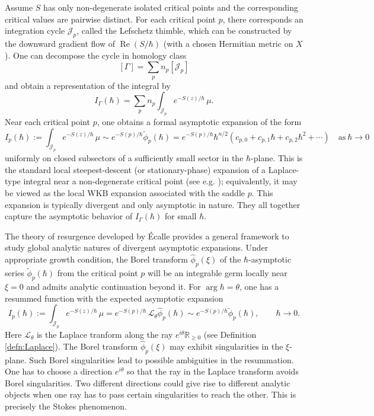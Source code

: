 \documentclass[11pt]{amsart}
\theoremstyle{plain}
\theoremstyle{definition}
\newcommand{\R}{\mathbb{R}}
\DeclareMathOperator{\re}{Re}
\begin{document}
Assume $S$ has only non-degenerate isolated critical points and the corresponding critical values are pairwise distinct. For each critical point $p$, there corresponds an integration cycle $\mathcal J_p$, called the Lefschetz thimble, which can be constructed by the downward gradient flow of $\re(S/\hbar)$ (with a chosen Hermitian metric on $X$). One can decompose the cycle in homology class
$$
[\Gamma]=\sum_p n_p [\mathcal J_p]
$$
and obtain a representation of the integral by
$$
I_\Gamma(\hbar)=\sum_{p}n_p \int_{\mathcal J_p} e^{-S(z)/\hbar}\,\mu.
$$
Near each critical point $p$, one obtains a formal asymptotic expansion of the form 
$$
I_p(\hbar) :=\int_{\mathcal J_p} e^{-S(z)/\hbar}\,\mu \sim e^{-S(p)/\hbar}\tilde \phi_p(\hbar)= e^{-S(p)/\hbar}\hbar^{n/2}\left(c_{p,0}+c_{p,1}\hbar+c_{p,2}\hbar^2+\cdots\right)\quad \text{as}\ \hbar\to 0 
$$
uniformly on closed subsectors of a sufficiently small sector in the $\hbar$-plane. This is the standard local steepest-descent (or stationary-phase) expansion of a Laplace-type integral near a non-degenerate critical point (see e.g. \cite{BleisteinHandelsman,PhamSaddlepoint}); equivalently, it may be viewed as the local WKB expansion associated with the saddle $p$.
This expansion is typically divergent and only asymptotic in nature. They all together capture the asymptotic behavior of $I_\Gamma(\hbar)$ for small $\hbar$. 

The theory of resurgence developed by \'Ecalle \cite{Ecalle1981I,Ecalle1981II,Ecalle1985III} provides a general framework to study global analytic natures of divergent asymptotic expansions. Under appropriate growth condition, the Borel transform $\hat \phi_p(\xi)$ of the $\hbar$-asymptotic series $\tilde \phi_p(\hbar)$ from the critical point $p$ will be an integrable germ locally near $\xi=0$ and admits analytic continuation beyond it. For $\arg \hbar = \theta$,  one has a resummed function with the expected asymptotic expansion
\[
I_p(\hbar)
:=
\int_{\mathcal J_p} e^{-S(z)/\hbar}\,\mu
=
e^{-S(p)/\hbar}\,
\mathcal L_\theta\widehat\phi_p(\hbar) \sim e^{-S(p)/\hbar}
\widetilde\phi_p(\hbar),
\qquad \hbar\to0.
\]
Here $\mathcal L_\theta$ is the Laplace tranform along the ray  $e^{i\theta}\R_{\geq 0}$ (see Definition \ref{defn:Laplace}). %
The Borel transform $\hat \phi_p(\xi)$ may exhibit singularities in the $\xi$-plane. Such Borel singularities lead to possible ambiguities in the resummation. One has to choose a direction $e^{i\theta}$ so that the ray in the Laplace transform avoids Borel singularities. Two different directions could give rise to different analytic objects when one ray has to pass certain singularities to reach the other. This is precisely the Stokes phenomenon. 
\end{document}
